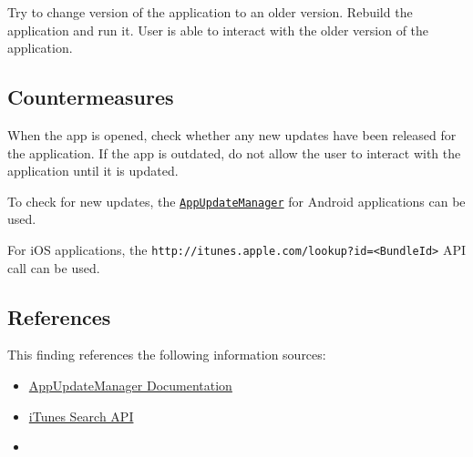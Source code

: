 Try to change version of the application to an older version.
Rebuild the application and run it.
User is able to interact with the older version of the application.

 

\subsection*{Countermeasures}

When the app is opened, check whether any new updates have been released for the application.
If the app is outdated, do not allow the user to interact with the application until it is updated.

To check for new updates, the \texttt{\href{https://developer.android.com/reference/com/google/android/play/core/appupdate/AppUpdateManager}{AppUpdateManager}} for Android applications can be used.

For iOS applications, the \texttt{http://itunes.apple.com/lookup?id=<BundleId>} API call can be used.

\pagebreak
\subsection*{References}

This finding references the following information sources:

\begin{itemize}
    \item \href{https://developer.android.com/reference/com/google/android/play/core/appupdate/AppUpdateManager}{AppUpdateManager Documentation}
    \item \href{https://performance-partners.apple.com/search-api}{iTunes Search API}
	\item {}
\end{itemize}


